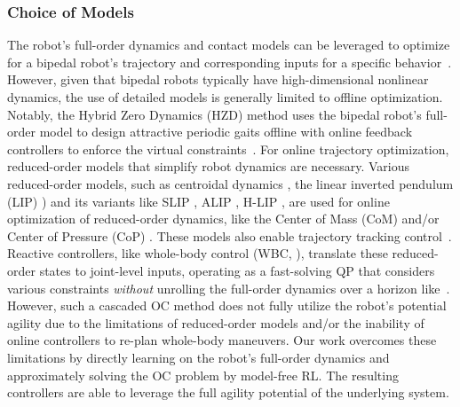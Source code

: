 \subsubsection{Choice of Models}
The robot's full-order dynamics and contact models can be leveraged to optimize for a bipedal robot's trajectory and corresponding inputs for a specific behavior~\citep{hereid2019rapid,fevre2020rapid,marcucci2016two}.
However, given that bipedal robots typically have high-dimensional nonlinear dynamics, the use of detailed models is generally limited to offline optimization. 
Notably, the Hybrid Zero Dynamics (HZD) method \citep{westervelt2003hybrid} uses the bipedal robot's full-order model to design attractive periodic gaits offline with online feedback controllers to enforce the virtual constraints~\citep{hereid2018dynamic,reher2021control,gong2019feedback}. 
For online trajectory optimization, reduced-order models that simplify robot dynamics are necessary. 
Various reduced-order models, such as centroidal dynamics \citep{orin2013centroidal}, the linear inverted pendulum (LIP) \citep{kajita20013d}) and its variants like SLIP \citep{rummel2010stable}, ALIP \citep{gong2022zero}, H-LIP \citep{xiong20223}, are used for online optimization of reduced-order  dynamics, like the Center of Mass (CoM) and/or Center of Pressure (CoP) \citep{vukobratovic2004zero,pratt2012capturability,fernbach2020c}. These models also enable trajectory tracking control~\citep{kuindersma2014efficiently,daneshmand2021variable,gong2022zero}.
Reactive controllers, like whole-body control (WBC, \cite{sentis2006whole}), translate these reduced-order states to joint-level inputs, operating as a fast-solving QP that considers various constraints \emph{without} unrolling the full-order dynamics over a horizon like~\cite{moro2019whole,bouyarmane2011using,wensing2016improved}.
However, such a cascaded OC method does not fully utilize the robot's potential agility due to the limitations of reduced-order models and/or the inability of online controllers to re-plan whole-body maneuvers.
Our work overcomes these limitations by directly learning on the robot's full-order dynamics and approximately solving the OC problem by model-free RL. The resulting controllers are able to leverage the full agility potential of the underlying system.

